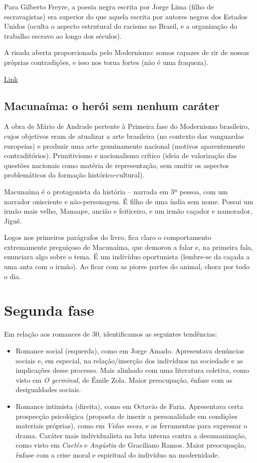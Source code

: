Para Gilberto Freyre, a poesia negra escrita por Jorge Lima (filho de escravagistas) era superior do que aquela escrita por autores negros dos Estados Unidos (oculta o aspecto estrutural do racismo no Brasil, e a organização do trabalho escravo ao longo dos séculos).

A risada aberta proporcionada pelo Modernismo: somos capazes de rir de nossas próprias contradições, e isso nos torna fortes (não é uma fraqueza).

\href{https://www.ufrgs.br/cdrom/oandrade/oandrade.pdf}{Link}

\subsection{Macunaíma: o herói sem nenhum caráter}

A obra de Mário de Andrade pertente à Primeira fase do Modernismo brasileiro, cujos objetivos eram de atualizar a arte brasileira (no contexto das vanguardas europeias) e produzir uma arte genuinamente nacional (motivos aparentemente contraditórios). Primitivismo e nacionalismo crítico (ideia de valorização das questões nacionais como matéria de representação, sem omitir os aspectos problemáticos da formação histórico-cultural).

Macunaíma é o protagonista da história -- narrada em 3ª pessoa, com um narrador onisciente e não-personagem. É filho de uma índia sem nome. Possui um irmão mais velho, Manaape, ancião e feiticeiro, e um irmão caçador e namorador, Jiguê.

Logos nos primeiros parágrafos do livro, fica claro o comportamento extremamente preguiçoso de Macunaíma, que demorou a falar e, na primeira fala, enunciara algo sobre o tema. É um indivíduo oportunista (lembre-se da caçada a uma anta com o irmão). Ao ficar com as piores partes do animal, chora por todo o dia.

\section{Segunda fase}
Em relação aos romances de 30, identificamos as seguintes tendências:

\begin{itemize}
\item Romance social (esquerda), como em Jorge Amado. Apresentava denúncias sociais e, em especial, na relação/inserção dos indivíduos na sociedade e as implicações desse processo. Mais alinhado com uma literatura coletiva, como visto em \textit{O germinal}, de Émile Zola. Maior preocupação, ênfase com as desigualdades sociais.
\item Romance intimista (direita), como em Octavio de Faria. Apresentava certa prospecção psicológica (proposta de inserir a personalidade em condições materiais próprias), como em \textit{Vidas secas}, e as ferramentas para expressar o drama. Caráter mais individualista na luta interna contra a desumanização, como visto em \textit{Caetés} e \textit{Angústia} de Graciliano Ramos. Maior preocupação, ênfase com a crise moral e espiritual do indivíduo na modernidade.
\end{itemize}

